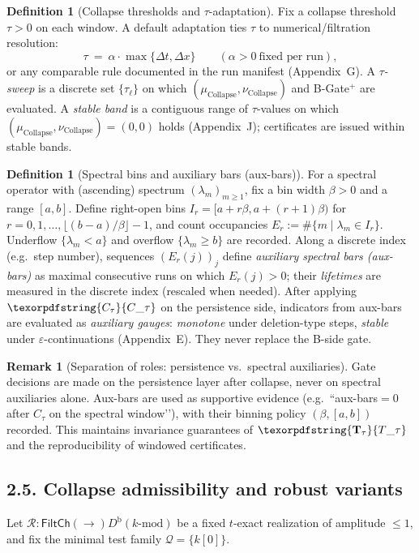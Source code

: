 \documentclass[11pt]{article}
\numberwithin{equation}{section}
\theoremstyle{plain}
\theoremstyle{definition}
\theoremstyle{remark}
\theoremstyle{plain}
\theoremstyle{definition}
\numberwithin{equation}{section}
\theoremstyle{definition}
\newtheorem{definition}[theorem]{Definition}
\newtheorem{remark}[theorem]{Remark}
\DeclareRobustCommand{\FiltCh}[1]{\mathsf{FiltCh}(#1)}
\DeclareRobustCommand{\Ttau}{\texorpdfstring{\ensuremath{\mathbf{T}_{\tau}}}{T\_\tau}}
\DeclareRobustCommand{\Ctau}{\texorpdfstring{\ensuremath{C_{\tau}}}{C\_\tau}}
\numberwithin{equation}{section}
\theoremstyle{plain}
\theoremstyle{definition}
\theoremstyle{remark}
\newcommand{\Dbk}{D^{\mathrm{b}}(k\text{-mod})}
\providecommand{\Cfun}[1]{\mathsf{C}_{#1}}
\providecommand{\Tfun}[1]{\mathbf{T}_{#1}}
\providecommand{\Ctau}{\Cfun{\tau}}
\providecommand{\Ttau}{\Tfun{\tau}}
\begin{document}
\begin{definition}[Collapse thresholds and \(\tau\)-adaptation]\label{def:tau-adapt}
Fix a collapse threshold \(\tau>0\) on each window. A default adaptation ties \(\tau\) to numerical/filtration resolution:
\[
\tau\ =\ \alpha\cdot \max\{\Delta t,\Delta x\}\qquad (\alpha>0\ \text{fixed per run}),
\]
or any comparable rule documented in the run manifest (Appendix~G). A \emph{\(\tau\)-sweep} is a discrete set \(\{\tau_\ell\}\) on which \((\mu_{\mathrm{Collapse}},\nu_{\mathrm{Collapse}})\) and B-Gate\(^{+}\) are evaluated. A \emph{stable band} is a contiguous range of \(\tau\)-values on which \((\mu_{\mathrm{Collapse}},\nu_{\mathrm{Collapse}})=(0,0)\) holds (Appendix~J); certificates are issued within stable bands.
\end{definition}

\begin{definition}[Spectral bins and auxiliary bars (aux-bars)]\label{def:aux-bars}
For a spectral operator with (ascending) spectrum \((\lambda_m)_{m\ge 1}\), fix a bin width \(\beta>0\) and a range \([a,b]\). Define right-open bins \(I_r=[a+r\beta,a+(r+1)\beta)\) for \(r=0,1,\dots,\lfloor (b-a)/\beta\rfloor-1\), and count occupancies \(E_r:=\#\{m\mid \lambda_m\in I_r\}\). Underflow \(\{\lambda_m<a\}\) and overflow \(\{\lambda_m\ge b\}\) are recorded. Along a discrete index (e.g.\ step number), sequences \((E_r(j))_j\) define \emph{auxiliary spectral bars (aux-bars)} as maximal consecutive runs on which \(E_r(j)>0\); their \emph{lifetimes} are measured in the discrete index (rescaled when needed). After applying \(\Ctau\) on the persistence side, indicators from aux-bars are evaluated as \emph{auxiliary gauges}: \emph{monotone} under deletion-type steps, \emph{stable} under \(\varepsilon\)-continuations (Appendix~E). They never replace the B-side gate.
\end{definition}

\begin{remark}[Separation of roles: persistence vs.\ spectral auxiliaries]\label{rem:sep-persist-spectral}
Gate decisions are made on the persistence layer after collapse, never on spectral auxiliaries alone. Aux-bars are used as supportive evidence (e.g.\ “aux-bars\(=0\) after \(C_\tau\) on the spectral window’’), with their binning policy \((\beta,[a,b])\) recorded. This maintains invariance guarantees of \(\Ttau\) and the reproducibility of windowed certificates.
\end{remark}

\subsection*{2.5. Collapse admissibility and robust variants}
Let \(\mathcal{R}:\FiltCh\to\Dbk\) be a fixed \(t\)-exact realization of amplitude \(\le 1\), and fix the minimal test family \(\mathcal{Q}=\{k[0]\}\).
\end{document}
